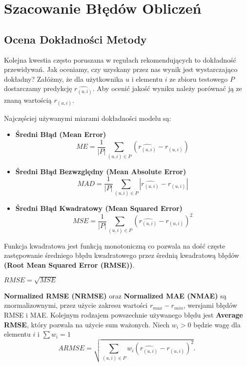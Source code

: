 \documentclass[12pt,a4paper]{report}
\begin{document}
\section{Szacowanie Błędów Obliczeń}
\subsection{Ocena Dokładności Metody}%
Kolejna kwestia często poruszana w regułach rekomendujących to dokładność przewidywań. Jak oceniamy, czy uzyskany przez nas wynik jest wystarczająco dokładny? 
Załóżmy, że dla użytkownika $u$ i elementu $i$ ze zbioru testowego $P$ dostarczamy predykcję $\widehat{r_{(u,i)}}$. Aby ocenić jakość wyniku należy porównać ją ze znaną wartością $r_{(u,i)}$.

Najczęściej używanymi miarami dokładności modelu są:
\begin{itemize}
\item \textbf{Średni Błąd (Mean Error)}
$$ME = \frac{1}{|P|}\sum_{(u,i)\in P}(\widehat{r_{(u,i)}}-r_{(u,i)})$$

\item \textbf{Średni Błąd Bezwzględny (Mean Absolute Error)}
$$MAD = \frac{1}{|P|}\sum_{(u,i)\in P}|\widehat{r_{(u,i)}}-r_{(u,i)}|$$

\item \textbf{Średni Błąd Kwadratowy (Mean Squared Error)}
$$MSE = \frac{1}{|P|}\sum_{(u,i)\in P}(\widehat{r_{(u,i)}}-r_{(u,i)})^2$$
\end{itemize}
Funkcja kwadratowa jest funkcją monotoniczną co pozwala na dość częste zastępowanie średniego błędu kwadratowego przez średnią kwadratową błędów \textbf{(Root Mean Squared Error (RMSE))}.
\begin{center}
$RMSE = \sqrt{MSE}$
\end{center} 
\textbf{Normalized RMSE (NRMSE)} oraz \textbf{Normalized MAE (NMAE)} są znormalizownymi, przez użycie zakresu wartości $r_{max} - r_{min}$, wersjami błędów RMSE i MAE.
Kolejnym rodzajem powszechnie używanego błędu jest \textbf{Average RMSE}, który pozwala na użycie sum ważonych. Niech $w_i>0$ będzie wagę dla elementu $i$ i $\sum w_i = 1$
$$ARMSE = \sqrt{\sum_{(u,i)\in P}w_{i}(\widehat{r_{(u,i)}}-r_{(u,i)})^2}.$$
\end{document}
